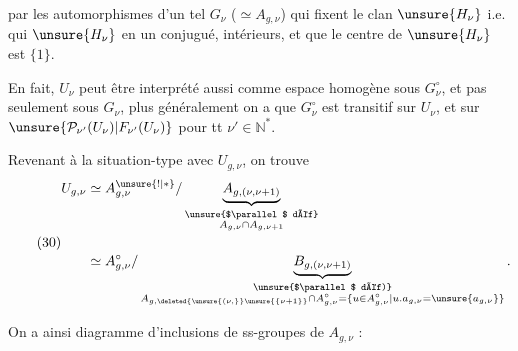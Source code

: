 par les automorphismes d'un tel $G_\nu$ ($\simeq A_{g,\nu}$) qui fixent le clan $\unsure{H_\nu}$ i.e. qui  $\unsure{H_\nu}$ en un conjugué,   intérieurs, et que le centre de $\unsure{H_\nu}$ est $\{1\}$.

En fait, $U_\nu$ peut être interprété aussi comme espace homogène sous $G_\nu^\circ$, et pas seulement sous $G_\nu$, plus généralement on a que $G_\nu^\circ$ est transitif sur $U_\nu$, et  sur $\unsure{\mathcal P_{\nu'}(U_\nu)|F_{\nu'}(U_\nu)}$ pour tt $\nu'\in\mathbb N^*$.

Revenant à la situation-type avec $U_{g,\nu}$, on trouve
\[
\tag{30}
\begin{aligned}
U_{g,\nu}
&\simeq A_{g,\nu}^{\unsure{!|*}}/
\underbrace{A_{g,(\nu,\nu+1)}}_{\substack{\text{\unsure{$\parallel$ déf}}\\ A_{g,\nu}\cap A_{g,\nu+1}}}\\[1.2em]
&\simeq A_{g,\nu}^{\circ}/
\underbrace{B_{g,(\nu,\nu+1)}}_{\substack{\text{\unsure{$\parallel$ déf)}}\\
 A_{g,\deleted{\unsure{(\nu,}}\unsure{\{\nu+1\}}}\cap A_{g,\nu}^{\circ}
 =\{u\in A_{g,\nu}^{\circ}\mid u.a_{g,\nu}=\unsure{a_{g,\nu}}\}}}.
\end{aligned}
\]

On a ainsi   diagramme d'inclusions de ss-groupes de $A_{g,\nu}$ :

